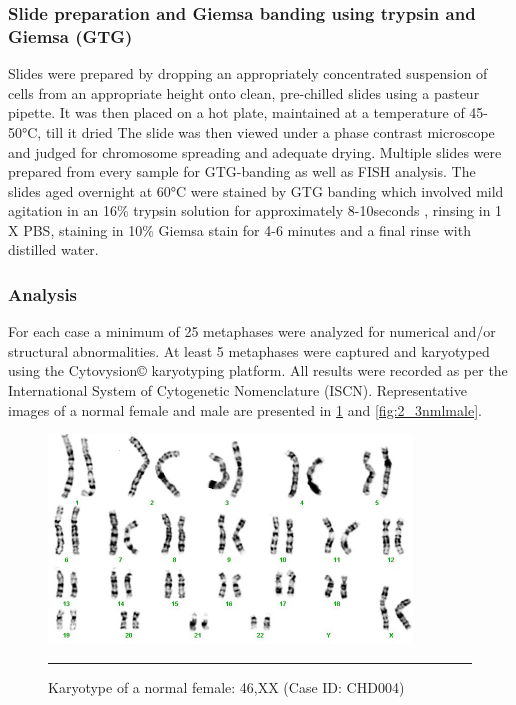 \subsubsection{Slide preparation and Giemsa banding using trypsin and Giemsa (GTG)}
Slides were prepared by dropping an appropriately concentrated suspension of cells from an appropriate height onto clean, pre-chilled slides using a pasteur pipette. It was then placed on a hot plate, maintained at a temperature of 45-50°C, till it dried The slide was then viewed under a phase contrast microscope and judged for chromosome spreading and adequate drying. Multiple slides were prepared from every sample for GTG-banding as well as FISH analysis. The slides aged overnight at 60°C were stained by GTG banding which involved mild agitation in an 16\%  trypsin solution for  approximately 8-10seconds , rinsing in 1 X PBS, staining in 10\% Giemsa stain for 4-6 minutes and a final rinse with distilled water. 
\subsubsection{Analysis}
For each case a minimum of 25 metaphases were analyzed for numerical and/or structural abnormalities. At least 5 metaphases were captured and karyotyped using the Cytovysion© karyotyping platform. All results were recorded as per the International System of Cytogenetic Nomenclature (ISCN). Representative images of a normal female and male are presented in \cref{fig:2_2nmlfemale} and \cref{fig:2_3nmlmale}.

\begin{figure}[!tb]
\centering
\includegraphics[width=\linewidth]{Figures/2_2nmlfemale.pdf} 
\rule{35em}{0.5pt}
\caption{Karyotype of a normal female: 46,XX (Case ID: CHD004)}
\label{fig:2_2nmlfemale}
\end{figure}


